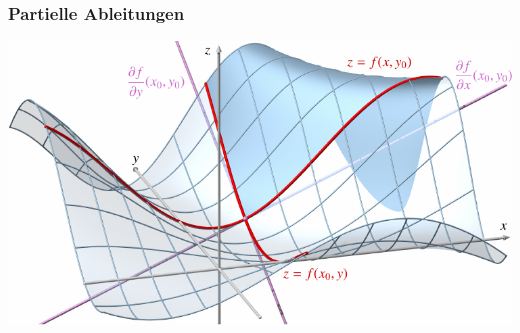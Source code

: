 %
%
%
\bgroup
\begin{frame}[t]
\setlength{\abovedisplayskip}{5pt}
\setlength{\belowdisplayskip}{5pt}
\frametitle{Partielle Ableitungen}
\centering
\includegraphics[width=\textwidth]{../slides/1/partabl.pdf}
\end{frame}
\egroup
